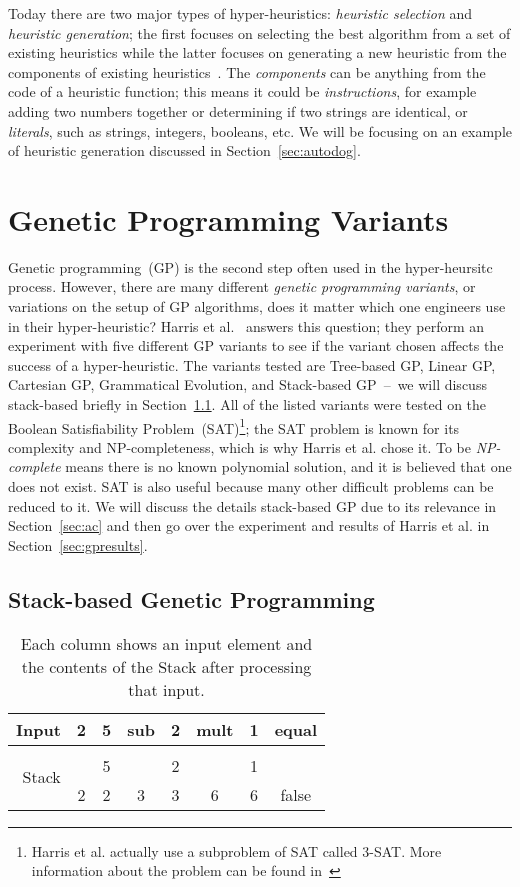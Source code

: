 \documentclass{sig-alternate}
\begin{document}
Today there are two major types of hyper-heuristics: \textit{heuristic selection} and \textit{heuristic generation}; the first focuses on selecting the best algorithm from a set of existing heuristics while the latter focuses on generating a new heuristic from the components of existing heuristics~\cite{pappa:2014}. The \textit{components} can be anything from the code of a heuristic function; this means it could be \textit{instructions}, for example adding two numbers together or determining if two strings are identical, or \textit{literals}, such as strings, integers, booleans, etc. We will be focusing on an example of heuristic generation discussed in Section~\ref{sec:autodog}.

\section{Genetic Programming Variants}
\label{sec:gpvariants}
Genetic programming~(GP) is the second step often used in the hyper-heursitc process. However, there are many different \textit{genetic programming variants}, or variations on the setup of GP algorithms, does it matter which one engineers use in their hyper-heuristic? Harris et al.~\cite{harris:2015} answers this question; they perform an experiment with five different GP variants to see if the variant chosen affects the success of a hyper-heuristic. The variants tested are Tree-based GP, Linear GP, Cartesian GP, Grammatical Evolution, and Stack-based GP~--~we will discuss stack-based briefly in Section~\ref{sec:sgp}. All of the listed variants were tested on the Boolean Satisfiability Problem~(SAT)\footnote{Harris et al. actually use a subproblem of SAT called 3-SAT. More information about the problem can be found in~\cite{harris:2015}}; the SAT problem is known for its complexity and NP-completeness, which is why Harris et al. chose it. To be \textit{NP-complete} means there is no known polynomial solution, and it is believed that one does not exist. SAT is also useful because many other difficult problems can be reduced to it. We will discuss the details stack-based GP due to its relevance in Section~\ref{sec:ac} and then go over the experiment and results of Harris et al. in Section~\ref{sec:gpresults}.

\subsection{Stack-based Genetic Programming}
\label{sec:sgp}
\begin{table}
	\centering
	\begin{tabular}{|r|c|c|c|c|c|c|c|}
		\hline
		Input & 2 & 5 & sub & 2 & mult & 1 & equal\\
		\hline
		\multirow{3}{*}{Stack} & & & & & & & \\
		&   & 5 &   & 2 &   & 1 & \\
		& 2 & 2 & 3 & 3 & 6 & 6 & false \\
		\hline
	\end{tabular}
	\caption{Each column shows an input element and the contents of the Stack after processing that input.}
	\label{tab:stacks}
\end{table}
\end{document}
